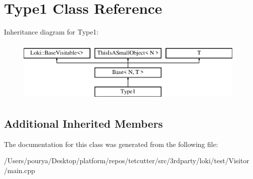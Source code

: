 \hypertarget{classType1}{}\section{Type1 Class Reference}
\label{classType1}
Inheritance diagram for Type1\+:\begin{figure}[H]
\begin{center}
\leavevmode
\includegraphics[height=3.000000cm]{classType1}
\end{center}
\end{figure}
\subsection*{Additional Inherited Members}


The documentation for this class was generated from the following file\+:\begin{DoxyCompactItemize}
\item 
/\+Users/pourya/\+Desktop/platform/repos/tetcutter/src/3rdparty/loki/test/\+Visitor/main.\+cpp\end{DoxyCompactItemize}
